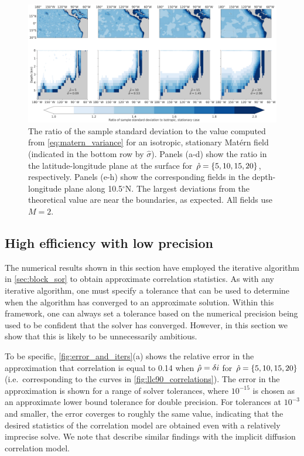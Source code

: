 \begin{figure}
    \centering
    \includegraphics[width=\textwidth]{../figures/std_ratio_02apps.jpg}
    \caption{The ratio of the sample standard deviation to the value computed
        from \cref{eq:matern_variance} for an isotropic, stationary Mat\'ern
        field (indicated in the bottom row by $\hat{\sigma}$).
        Panels (a-d) show the ratio in the latitude-longitude plane at
        the surface for $\hat{\rho}=\{5,10,15,20\}$, respectively. Panels (e-h)
        show the corresponding fields in the depth-longitude plane along 10.5$^\circ$N.
        The largest deviations from the theoretical value are near the boundaries, as
        expected.
        All fields use $M=2$.
    }
    \label{fig:std_ratio}
\end{figure}

\subsection{High efficiency with low precision}
\label{ssec:tolerance}

The numerical results shown in this section have employed the
iterative algorithm in \cref{sec:block_sor} to obtain approximate correlation
statistics.
As with any iterative algorithm, one must specify a
tolerance that can be used to determine when the algorithm has converged to an
approximate solution.
Within this framework, one can always set a tolerance based on the numerical
precision being used to be confident that the solver has converged.
However, in this section we show that this is likely to be
unnecessarily ambitious.

To be specific, \cref{fig:error_and_iters}(a) shows the relative error in the
approximation that correlation is equal to 0.14 when $\hat{\rho} = \delta i$
for $\hat{\rho} = \{5, 10, 15, 20\}$ (i.e.\ corresponding to the curves in
\cref{fig:llc90_correlations}).
The error in the approximation is shown for a range of solver tolerances,
where $10^{-15}$ is chosen as an approximate lower bound tolerance for double
precision.
For tolerances at $10^{-3}$ and smaller, the error coverges to roughly the same
value, indicating that the desired statistics of the correlation
model are obtained even with a relatively imprecise solve.
We note that \citet{carrier_background-error_2010} describe similar findings
with the implicit diffusion correlation model.

